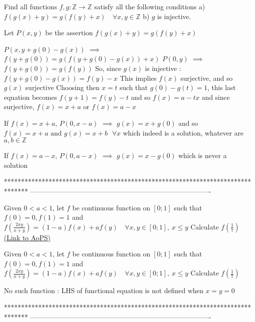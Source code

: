 \begin{solution}
	\begin{tcolorbox}Find all functions $f,g:\mathbb{Z}\to\mathbb{Z}$ satisfy all the following conditions
a) $f(g(x)+y)=g(f(y)+x) \quad \forall x,y\in\mathbb{Z}$
b) $g$ is injective.\end{tcolorbox}
Let $P(x,y)$ be the assertion $f(g(x)+y)=g(f(y)+x)$

$P(x,y+g(0)-g(x))$ $\implies$ $f(y+g(0))=g(f(y+g(0)-g(x))+x)$
$P(0,y)$ $\implies$ $f(y+g(0))=g(f(y))$
So, since $g(x)$ is injective : $f(y+g(0)-g(x))=f(y)-x$
This implies $f(x)$ surjective, and so $g(x)$ surjective
Choosing then $x=t$ such that $g(0)-g(t)=1$, this last equation becomes $f(y+1)=f(y)-t$ and so $f(x)=a-tx$ and since surjective, $f(x)=x+a$ or $f(x)=a-x$ 

If $f(x)=x+a$, $P(0,x-a)$ $\implies$ $g(x)=x+g(0)$ and so $\boxed{f(x)=x+a\text{ and }g(x)=x+b\text{  }\forall x}$ which indeed is a solution, whatever are $a,b\in\mathbb Z$

If $f(x)=a-x$, $P(0,a-x)$ $\implies$ $g(x)=x-g(0)$ which is never a solution
\end{solution}
*******************************************************************************
-------------------------------------------------------------------------------

\begin{problem}
	Given $0<a<1$, let $f$ be continuous function on $[0;1]$ such that $f(0)=0,f(1)=1$ and $f\left(\frac{2xy}{x+y}\right)=(1-a)f(x)+af(y)\quad \forall x,y\in[0;1], \ x\leq y$
Calculate $f\left(\frac{1}{7}\right)$
	\flushright \href{https://artofproblemsolving.com/community/c6h578346}{(Link to AoPS)}
\end{problem}



\begin{solution}
	\begin{tcolorbox}Given $0<a<1$, let $f$ be continuous function on $[0;1]$ such that $f(0)=0,f(1)=1$ and $f\left(\frac{2xy}{x+y}\right)=(1-a)f(x)+af(y)\quad \forall x,y\in[0;1], \ x\leq y$
Calculate $f\left(\frac{1}{7}\right)$\end{tcolorbox}
No such function : LHS of functional equation is not defined when $x=y=0$
\end{solution}
*******************************************************************************
-------------------------------------------------------------------------------

